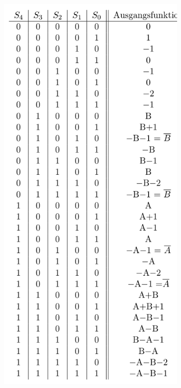 \documentclass[10pt]{article}
\newenvironment{Figure}
  {\par\medskip\noindent\minipage{\linewidth}}
  {\endminipage\par\medskip}
\begin{document}
\begin{multicols}{2}
\begin{Figure}
    \centering\includegraphics[width=0.7\textwidth]{addier-subtrahierwek-befehle.png}
    \label{fig:add-sub-befehl}
  \end{Figure}
  \begin{Figure}

\end{Figure}
\end{multicols}
\end{document}
